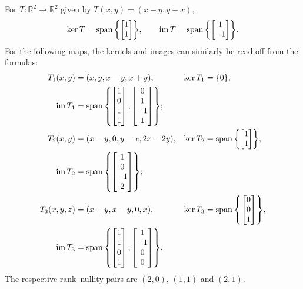 \begin{Example}
For $T\colon\mathbb R^2\to\mathbb R^2$ given by $T(x,y)=(x-y,y-x)$,
\begin{equation*}
\ker T=\operatorname{span}\qty{\begin{bmatrix}1\\1\end{bmatrix}},\qquad \operatorname{im} T=\operatorname{span}\qty{\begin{bmatrix}1\\-1\end{bmatrix}}.
\end{equation*}
For the following maps, the kernels and images can similarly be read off from the formulas:
\begin{align*}
T_1(x,y)&=(x,y,x-y,x+y),& \ker T_1&=\{0\},\\
\operatorname{im} T_1&=\operatorname{span}\qty{\begin{bmatrix}1\\0\\1\\1\end{bmatrix},\begin{bmatrix}0\\1\\-1\\1\end{bmatrix}};\\
T_2(x,y)&=(x-y,0,y-x,2x-2y),& \ker T_2&=\operatorname{span}\qty{\begin{bmatrix}1\\1\end{bmatrix}},\\
\operatorname{im} T_2&=\operatorname{span}\qty{\begin{bmatrix}1\\0\\-1\\2\end{bmatrix}};\\
T_3(x,y,z)&=(x+y,x-y,0,x),& \ker T_3&=\operatorname{span}\qty{\begin{bmatrix}0\\0\\1\end{bmatrix}},\\
\operatorname{im} T_3&=\operatorname{span}\qty{\begin{bmatrix}1\\1\\0\\1\end{bmatrix},\begin{bmatrix}1\\-1\\0\\0\end{bmatrix}}.
\end{align*}
The respective rank--nullity pairs are $(2,0)$, $(1,1)$ and $(2,1)$.
\end{Example}

